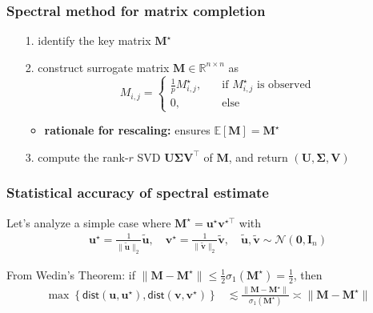 \documentclass[compress,
mathserif,wide,%
]{beamer}
\begin{document}
\begin{frame}
\frametitle{Spectral method for matrix completion}

\begin{itemize}
	
	\item[{\color{black}1.}] identify the key matrix $\bm{M}^{\star}$
	\item[{\color{black}2.}] construct surrogate matrix ${\bm{M}}\in \mathbb{R}^{n\times n}$ as
	\[
		{M}_{i,j} = \begin{cases} \frac{1}{p} M_{i,j}^{\star}, \quad & \text{if }M_{i,j}^{\star}\text{ is observed} \\ 
					0,  & \text{else}	\end{cases} 
	\]
	\begin{itemize}
		\item {\bf rationale for rescaling:} ensures $\mathbb{E}[{\bm{M}}] = \bm{M}^{\star}$
	\end{itemize}

	\bigskip

\item[{\color{black}3.}] compute the rank-$r$ SVD ${\bm{U}}{\bm{\Sigma}}{\bm{V}}^{\top}$ of ${\bm{M}}$, and return $({\bm{U}}, {\bm{\Sigma}}, {\bm{V}})$

	
\end{itemize}


\end{frame}


\begin{frame}
\frametitle{Statistical accuracy of spectral estimate}

Let's analyze a simple case where $\bm{M}^{\star}=\bm{u}^\star \bm{v}^{\star\top}$ with
%
\begin{align*}
	\bm{u}^\star = \frac{1}{\|\tilde{\bm{u}}\|_2} \tilde{\bm{u}}, \quad \bm{v}^\star = \frac{1}{\|\tilde{\bm{v}}\|_2} \tilde{\bm{v}}, \quad \tilde{\bm{u}}, \tilde{\bm{v}} \sim \mathcal{N}(\bm{0},\bm{I}_n)
\end{align*}
%

\vfill

From Wedin's Theorem: if $\|\bm{M} - \bm{M}^\star\| \leq \frac{1}{2} \sigma_{1}(\bm{M}^{\star}) = \frac{1}{2}$, then
%
\begin{align}
	\max\left\{ \mathsf{dist}({\bm{u}},\bm{u}^{\star} ),\mathsf{dist}( {\bm{v}},\bm{v}^{\star} )\right\} 
	& \lesssim \frac{ \| {\bm{M}} - \bm{M}^\star \|  }{\sigma_1(\bm{M}^\star)} \asymp \|\bm{M} - \bm{M}^\star\|
\end{align}
%


\end{frame}
\end{document}
